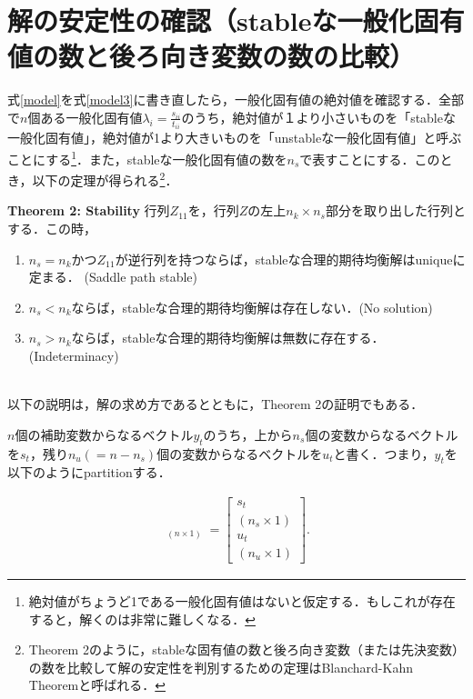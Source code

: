 \documentclass[a4j, dvipdfmx]{jarticle}
\begin{document}
\section{解の安定性の確認（stableな一般化固有値の数と後ろ向き変数の数の比較）}
式\eqref{model}を式\eqref{model3}に書き直したら，一般化固有値の絶対値を確認する．全部で$n$個ある一般化固有値$\lambda_i = \frac{s_{ii}}{t_{ii}}$のうち，絶対値が１より小さいものを「stableな一般化固有値」，絶対値が1より大きいものを「unstableな一般化固有値」と呼ぶことにする\footnote{絶対値がちょうど1である一般化固有値はないと仮定する．もしこれが存在すると，解くのは非常に難しくなる．}．また，stableな一般化固有値の数を$n_s$で表すことにする．このとき，以下の定理が得られる\footnote{Theorem 2のように，stableな固有値の数と後ろ向き変数（または先決変数）の数を比較して解の安定性を判別するための定理はBlanchard-Kahn Theoremと呼ばれる．}．\\

\begin{itembox}[l]{{\bf Theorem 2: Stability}}
行列$Z_{11}$を，行列$Z$の左上$n_k\times n_s$部分を取り出した行列とする．この時，
\begin{enumerate}
\item $n_s = n_k$かつ$Z_{11}$が逆行列を持つならば，stableな合理的期待均衡解はuniqueに定まる． (Saddle path stable)
\item $n_s < n_k$ならば，stableな合理的期待均衡解は存在しない．(No solution)
\item $n_s > n_k$ならば，stableな合理的期待均衡解は無数に存在する．(Indeterminacy)
\end{enumerate}
\end{itembox}
\\

以下の説明は，解の求め方であるとともに，Theorem 2の証明でもある．

$n$個の補助変数からなるベクトル$y_t$のうち，上から$n_s$個の変数からなるベクトルを$s_t$，残り$n_u (=n-n_s)個$の変数からなるベクトルを$u_t$と書く．つまり，$y_t$を以下のようにpartitionする．

\begin{align}
\mathop{y_t}_{(n\times 1)} = \begin{bmatrix}s_t \\ {\scriptscriptstyle (n_s \times 1)} \\ u_t \\ {\scriptscriptstyle (n_u \times 1)}\end{bmatrix}.
\end{align}
\end{document}
